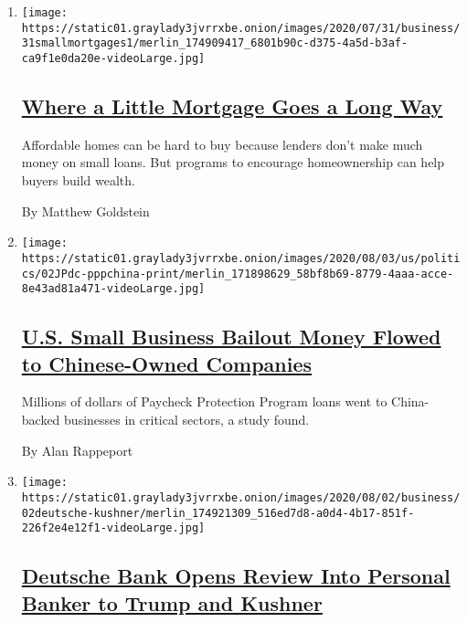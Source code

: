 \begin{enumerate}
\def\labelenumi{\arabic{enumi}.}
\item
  \texttt{[image: https://static01.graylady3jvrrxbe.onion/images/2020/07/31/business/31smallmortgages1/merlin\_174909417\_6801b90c-d375-4a5d-b3af-ca9f1e0da20e-videoLarge.jpg]}

  \hypertarget{where-a-little-mortgage-goes-a-long-way}{%
  \subsection{\texorpdfstring{\href{/2020/08/02/business/mortgages-affordable-housing.html}{Where
  a Little Mortgage Goes a Long
  Way}}{Where a Little Mortgage Goes a Long Way}}\label{where-a-little-mortgage-goes-a-long-way}}

  Affordable homes can be hard to buy because lenders don't make much
  money on small loans. But programs to encourage homeownership can help
  buyers build wealth.

  By Matthew Goldstein
\item
  \texttt{[image: https://static01.graylady3jvrrxbe.onion/images/2020/08/03/us/politics/02JPdc-pppchina-print/merlin\_171898629\_58bf8b69-8779-4aaa-acce-8e43ad81a471-videoLarge.jpg]}

  \hypertarget{us-small-business-bailout-money-flowed-to-chinese-owned-companies}{%
  \subsection{\texorpdfstring{\href{/2020/08/02/us/politics/virus-china-ppp-small-business-loans.html}{U.S.
  Small Business Bailout Money Flowed to Chinese-Owned
  Companies}}{U.S. Small Business Bailout Money Flowed to Chinese-Owned Companies}}\label{us-small-business-bailout-money-flowed-to-chinese-owned-companies}}

  Millions of dollars of Paycheck Protection Program loans went to
  China-backed businesses in critical sectors, a study found.

  By Alan Rappeport
\item
  \texttt{[image: https://static01.graylady3jvrrxbe.onion/images/2020/08/02/business/02deutsche-kushner/merlin\_174921309\_516ed7d8-a0d4-4b17-851f-226f2e4e12f1-videoLarge.jpg]}

  \hypertarget{deutsche-bank-opens-review-into-personal-banker-to-trump-and-kushner}{%
  \subsection{\texorpdfstring{\href{/2020/08/02/business/kushner-deutsche-trump-rosemary-vrablic.html}{Deutsche
  Bank Opens Review Into Personal Banker to Trump and
  Kushner}}{Deutsche Bank Opens Review Into Personal Banker to Trump and Kushner}}\label{deutsche-bank-opens-review-into-personal-banker-to-trump-and-kushner}}


\end{enumerate}
